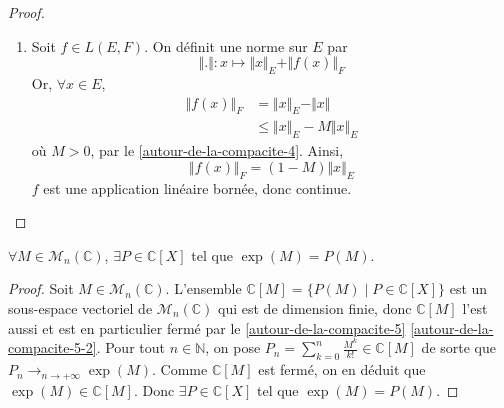 \begin{proof}
\begin{enumerate}[label={\bfseries(\roman*)}]
\begin{align*}
        &< \epsilon
      \end{align*}
      Donc $(x_n)$ est une suite de Cauchy de $F$, qui est de dimension finie, donc complet par le \cref{autour-de-la-compacite-5-2}. $(x_n)$ converge donc dans $F$, et par unicité de la limite, on a $x \in F$. Par la caractérisation séquentielle des fermés, $F$ est bien fermé dans $E$.
      \item Soit $f \in L(E,F)$. On définit une norme sur $E$ par
      \[ \Vert . \Vert : x \mapsto \Vert x \Vert_E + \Vert f(x) \Vert_F \]
      Or, $\forall x \in E$,
      \begin{align*}
        \Vert f(x) \Vert_F &=\Vert x \Vert_E - \Vert x \Vert \\
        &\leq \Vert x \Vert_E - M\Vert x \Vert_E
      \end{align*}
      où $M > 0$, par le \cref{autour-de-la-compacite-4}.
      Ainsi,
      \[ \Vert f(x) \Vert_F = (1-M)\Vert x \Vert_E \]
      $f$ est une application linéaire bornée, donc continue.
    \end{enumerate}
  \end{proof}

  \begin{application}
    $\forall M \in \mathcal{M}_n(\mathbb{C})$, $\exists P \in \mathbb{C}[X]$ tel que $\exp(M) = P(M)$.
  \end{application}

  \begin{proof}
    Soit $M \in \mathcal{M}_n(\mathbb{C})$. L'ensemble $\mathbb{C}[M] = \{ P(M) \mid P \in \mathbb{C}[X] \}$ est un sous-espace vectoriel de $\mathcal{M}_n(\mathbb{C})$ qui est de dimension finie, donc $\mathbb{C}[M]$ l'est aussi et est en particulier fermé par le \cref{autour-de-la-compacite-5} \cref{autour-de-la-compacite-5-2}.
    \newpar
    Pour tout $n \in \mathbb{N}$, on pose $P_n = \sum_{k=0}^n \frac{M^k}{k!} \in \mathbb{C}[M]$ de sorte que $P_n \longrightarrow_{n \rightarrow +\infty} \exp(M)$. Comme $\mathbb{C}[M]$ est fermé, on en déduit que $\exp(M) \in \mathbb{C}[M]$. Donc $\exists P \in \mathbb{C}[X]$ tel que $\exp(M) = P(M)$.
  \end{proof}

